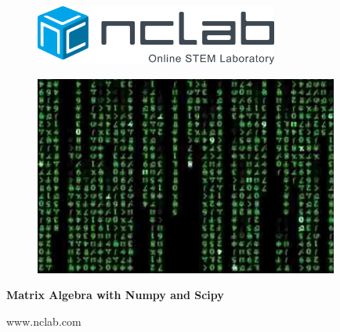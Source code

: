 \documentclass{article}
\begin{document}
\large

\vbox{}
\begin{figure}[!ht]
\includegraphics[width=8cm]{img/logo.png}
\vspace{29mm}
\end{figure}

\begin{figure}[!ht]
\begin{center}
\includegraphics[width=10cm]{img/frontpage.png}
\vspace{29mm}
\end{center}
\end{figure}

\centerline{\Huge \bf Matrix Algebra with Numpy and Scipy}

\vfill

\centerline{\Large www.nclab.com}

\newpage




\section*{}
\small


\end{document}

